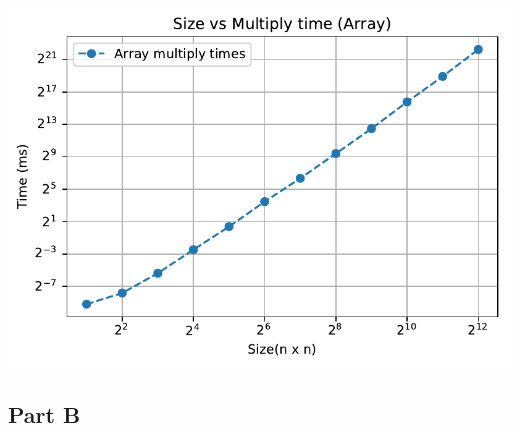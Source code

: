 \documentclass[12pt, a4paper]{report}
\begin{document}
\begin{center}
\includegraphics{multiply_arr.pdf}
\end{center}


\newpage


\begin{center}
\section*{Part B}
\end{center}
\end{document}
